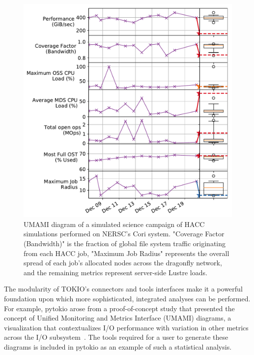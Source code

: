 \begin{figure}[t]
    \centering
    \includegraphics[width=1.0\columnwidth]{umami}
    \vspace{-.3in}
    \caption{UMAMI diagram of a simulated science campaign of HACC~\cite{Habib2012} simulations performed on NERSC's Cori system.  
    "Coverage Factor (Bandwidth)" is the fraction of global file system traffic originating from each HACC job, "Maximum Job Radius" represents the overall spread of each job's allocated nodes across the dragonfly network, and the remaining metrics represent server-side Lustre loads.}
    \label{fig:umami}
    \vspace{-.2in}
\end{figure}

The modularity of TOKIO's connectors and tools interfaces make it a powerful foundation upon which more sophisticated, integrated analyses can be performed.
For example, pytokio arose from a proof-of-concept study that presented the concept of Unified Monitoring and Metrics Interface (UMAMI) diagrams, a visualization that contextualizes I/O performance with variation in other metrics across the I/O subsystem~\cite{Lockwood2017}.
The tools required for a user to generate these diagrams is included in pytokio as an example of such a statistical analysis.

